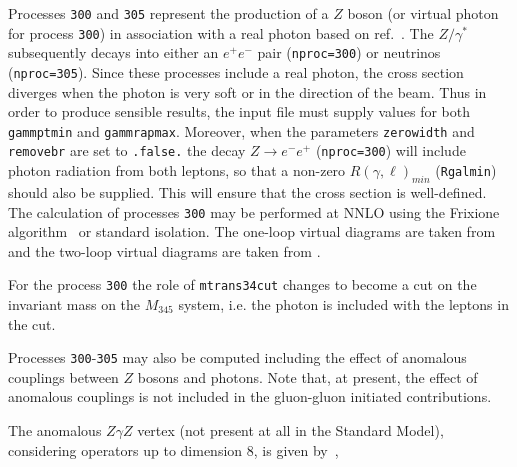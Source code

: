 \label{subsec:zgamma}


Processes {\tt 300} and {\tt 305} represent the production of a $Z$ boson (or virtual photon for process {\tt 300})
in association with a real photon based on ref.~\cite{Campbell:2017aul}. The $Z/\gamma^*$ subsequently decays into
either an $e^+ e^-$ pair ({\tt nproc=300}) or neutrinos ({\tt nproc=305}).
Since these processes include a real photon, the cross section diverges
when the photon is very soft or in the direction of the beam.
Thus in order to produce sensible results, the input file must supply values for both
{\tt gammptmin} and {\tt gammrapmax}. Moreover, when the parameters {\tt zerowidth}
and {\tt removebr} are set to {\tt .false.} the decay $Z \to e^- e^+$ ({\tt nproc=300})
will include photon radiation from both leptons, so that a non-zero $R(\gamma,\ell)_{min}$
({\tt Rgalmin})
should also be supplied. This will ensure that the cross section is well-defined.
The calculation of processes {\tt 300} may be performed
at NNLO using the Frixione algorithm~\cite{Frixione:1998jh} or standard isolation.
The one-loop virtual diagrams are taken from \cite{Dixon:1998py} and the two-loop virtual diagrams
are taken from \cite{Gehrmann:2011ab}.


For the process {\tt 300}  the role of {\tt mtrans34cut} changes to become a cut
on the invariant mass on the $M_{345}$ system, i.e. the photon is included with the leptons in the cut.

Processes {\tt 300}-{\tt 305} may also be computed including the effect of anomalous couplings between $Z$ bosons and 
photons.
Note that, at present, the effect of anomalous couplings is not included in the gluon-gluon
initiated contributions.

The anomalous $Z\gamma Z$ vertex (not present at all in the Standard Model),
considering operators up to dimension 8, is given by~\cite{DeFlorian:2000sg},


